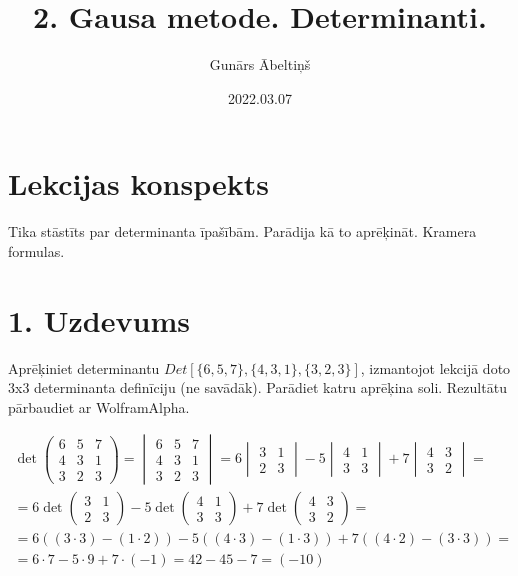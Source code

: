 \documentclass{article}
\title{2. Gausa metode. Determinanti.}
\author{Gunārs Ābeltiņš}
\date{2022.03.07}
\begin{document}
\maketitle

\section*{Lekcijas konspekts}
Tika stāstīts par determinanta īpašībām. Parādija kā to aprēķināt. Kramera formulas.

\clearpage

\section*{1. Uzdevums}
Aprēķiniet determinantu $Det[\{6,5,7\},\{4,3,1\},\{3,2,3\}]$, izmantojot lekcijā doto 3x3 determinanta definīciju (ne savādāk). Parādiet katru aprēķina soli. Rezultātu pārbaudiet ar WolframAlpha.

\begin{gather*}
    \det
    \begin{pmatrix}
        6 & 5 & 7\\
        4 & 3 & 1\\
        3 & 2 & 3
    \end{pmatrix} 
    =
    \begin{vmatrix}
        6 & 5 & 7\\
        4 & 3 & 1\\
        3 & 2 & 3
    \end{vmatrix}
    =
    6 \begin{vmatrix} 3 & 1 \\ 2 & 3 \end{vmatrix} 
    - 5 \begin{vmatrix} 4 & 1 \\ 3 & 3 \end{vmatrix} 
    + 7 \begin{vmatrix} 4 & 3 \\ 3 & 2 \end{vmatrix}
    =
    \\
    =
    6 \det\begin{pmatrix} 3 & 1 \\ 2 & 3 \end{pmatrix} 
    - 5 \det\begin{pmatrix} 4 & 1 \\ 3 & 3 \end{pmatrix} 
    + 7 \det\begin{pmatrix} 4 & 3 \\ 3 & 2 \end{pmatrix}
    =
    \\
    =
    6((3 \cdot 3) - (1 \cdot 2)) 
    - 5((4 \cdot 3) - (1 \cdot 3)) 
    + 7((4 \cdot 2) - (3 \cdot 3))
    =
    \\
    =
    6 \cdot 7 - 5 \cdot 9 + 7 \cdot (-1)
    =
    42 - 45 - 7
    =
    (-10)
\end{gather*}
\end{document}

